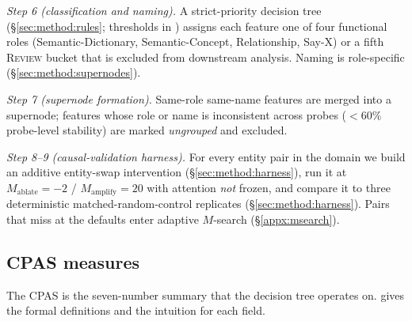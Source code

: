 \emph{Step 6 (classification and naming).} A strict-priority decision tree (\S\ref{sec:method:rules}; thresholds in ) assigns each feature one of four functional roles (Semantic-Dictionary, Semantic-Concept, Relationship, Say-X) or a fifth \textsc{Review} bucket that is excluded from downstream analysis. Naming is role-specific (\S\ref{sec:method:supernodes}).

\emph{Step 7 (supernode formation).} Same-role same-name features are merged into a supernode; features whose role or name is inconsistent across probes ($<60\%$ probe-level stability) are marked \emph{ungrouped} and excluded.

\emph{Step 8--9 (causal-validation harness).} For every entity pair in the domain we build an additive entity-swap intervention (\S\ref{sec:method:harness}), run it at $M_{\mathrm{ablate}}{=}-2$ / $M_{\mathrm{amplify}}{=}20$ with attention \emph{not} frozen, and compare it to three deterministic matched-random-control replicates (\S\ref{sec:method:harness}). Pairs that miss at the defaults enter adaptive $M$-search (\S\ref{appx:msearch}).

\subsection{CPAS measures}
The CPAS is the seven-number summary that the decision tree operates on.  gives the formal definitions and the intuition for each field.

